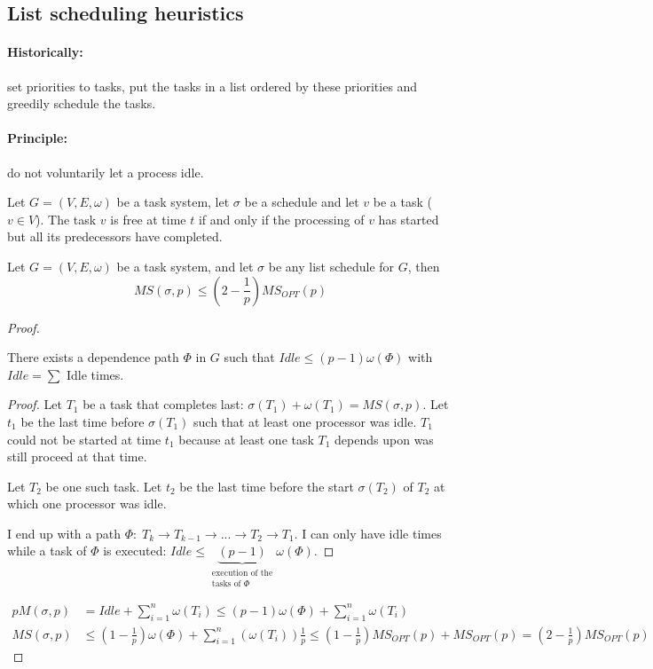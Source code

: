 \subsection{List scheduling heuristics}
\paragraph{Historically:} set priorities to tasks, put the tasks in a list ordered by these priorities and greedily schedule the tasks.

\paragraph{Principle:} do not voluntarily let a process idle.

\begin{defi}
Let $G=(V,E,\omega)$ be a task system, let $\sigma$ be a schedule and let $v$ be a task ($v\in V$). The task $v$ is free at time $t$ if and only if the processing of $v$ has started but all its predecessors have completed.
\end{defi}

\begin{thm}
Let $G=(V,E,\omega)$ be a task system, and let $\sigma$ be any list schedule for $G$, then 
\[
\tag{Graham's bound}
MS(\sigma , p) \leq \left(2 - \frac{1}{p}\right) MS_{OPT}(p)
\]
\end{thm}

\begin{proof}

\begin{lemma}
There exists a dependence path $\Phi$ in $G$ such that $Idle \leq (p-1)\omega (\Phi )$ with $Idle=\sum $ Idle times.
\end{lemma}
\begin{proof}
Let $T_1$ be a task that completes last: $\sigma (T_1) + \omega (T_1) = MS(\sigma , p)$. Let $t_1$ be the last time before $\sigma (T_1)$ such that at least one processor was idle. $T_1$ could not be started at time $t_1$ because at least one task $T_1$ depends upon was still proceed at that time.

Let $T_2$ be one such task. Let $t_2$ be the last time before the start $\sigma ( T_2)$ of $T_2$ at which one processor was idle.

I end up with a path $\Phi : \; T_k \to T_{k-1} \to ... \to T_2 \to T_1$. I can only have idle times while a task of $\Phi$ is executed: $Idle \leq \underbrace{(p-1)}_{\substack{\text{execution of the}\\\text{tasks of $\Phi$}}}\omega (\Phi)$.
\end{proof}

\begin{align*}
pM(\sigma,p)& = Idle + \sum_{i=1}^n \omega (T_i) \leq (p-1) \omega ( \Phi ) + \sum_{i=1}^n \omega ( T_i )\\
MS(\sigma,p) & \leq \left(1-\frac{1}{p}\right) \omega (\Phi) + \sum_{i=1}^n (\omega (T_i))\frac{1}{p} \leq \left(1-\frac{1}{p}\right) MS_{OPT}(p) + MS_{OPT}(p) = \left(2-\frac{1}{p} \right) MS_{OPT}(p)
\end{align*}
\end{proof}


